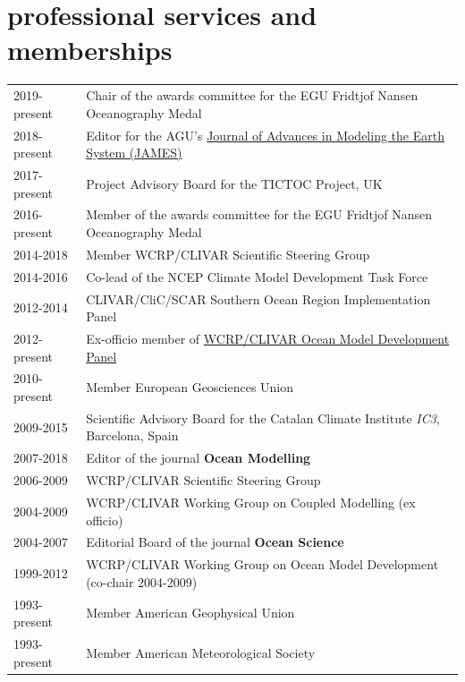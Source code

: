 \documentclass{article}
\begin{document}
\section*{\sc  \color{Maroon}  professional services and memberships}
\vspace{-.25cm}

\begin{tabular}{ll}
  2019-present & Chair of the awards committee for the EGU Fridtjof Nansen Oceanography Medal 
  \\
2018-present & Editor for the AGU's  \href{http://agupubs.onlinelibrary.wiley.com/hub/journal/10.1002/(ISSN)1942-2466/editorial-board/editorial-board.html}{Journal of Advances in Modeling the Earth System (JAMES)}  
\\
2017-present & Project Advisory Board for the TICTOC Project, UK
\\
  2016-present & Member of the awards committee for the EGU Fridtjof Nansen Oceanography Medal 
  \\
2014-2018 &  Member  WCRP/CLIVAR Scientific Steering Group \\
2014-2016     & Co-lead of the NCEP Climate Model Development Task Force\\
2012-2014     & CLIVAR/CliC/SCAR Southern Ocean Region Implementation Panel \\
2012-present & Ex-officio member of \href{http://www.clivar.org/clivar-panels/omdp}{WCRP/CLIVAR Ocean Model Development Panel} \\
2010-present & Member European Geosciences Union \\
2009-2015     &  Scientific Advisory Board for the Catalan  Climate Institute {\it IC3}, Barcelona, Spain \\
2007-2018 & Editor of the journal {\bf Ocean Modelling} \\
2006-2009     &  WCRP/CLIVAR Scientific Steering Group \\
2004-2009     &  WCRP/CLIVAR Working Group on Coupled Modelling (ex officio) \\
2004-2007     & Editorial Board of the journal {\bf Ocean Science} \\
1999-2012     & WCRP/CLIVAR Working Group on Ocean Model Development  (co-chair 2004-2009) \\
1993-present  & Member American Geophysical Union \\
1993-present  & Member American Meteorological Society \\
\end{tabular}
\end{document}
